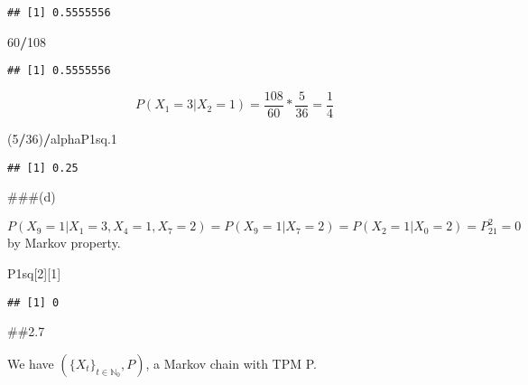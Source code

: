 \documentclass[]{article}
\newenvironment{Shaded}{\begin{snugshade}}{\end{snugshade}}
\newcommand{\DecValTok}[1]{\textcolor[rgb]{0.00,0.00,0.81}{#1}}
\newcommand{\FloatTok}[1]{\textcolor[rgb]{0.00,0.00,0.81}{#1}}
\newcommand{\NormalTok}[1]{#1}
\newcommand{\OperatorTok}[1]{\textcolor[rgb]{0.81,0.36,0.00}{\textbf{#1}}}
\newcommand{\StringTok}[1]{\textcolor[rgb]{0.31,0.60,0.02}{#1}}
\begin{document}
\begin{Shaded}
\end{Shaded}

\begin{verbatim}
## [1] 0.5555556
\end{verbatim}

\begin{Shaded}
\begin{Highlighting}[]
\DecValTok{60}\OperatorTok{/}\DecValTok{108}
\end{Highlighting}
\end{Shaded}

\begin{verbatim}
## [1] 0.5555556
\end{verbatim}

\[
P(X_1=3|X_2 = 1) = \frac{108}{60} * \frac{5}{36} =  \frac{1}{4}
\]

\begin{Shaded}
\begin{Highlighting}[]
\NormalTok{(}\DecValTok{5}\OperatorTok{/}\DecValTok{36}\NormalTok{)}\OperatorTok{/}\NormalTok{alphaP1sq}\FloatTok{.1}
\end{Highlighting}
\end{Shaded}

\begin{verbatim}
## [1] 0.25
\end{verbatim}

\#\#\#(d)

\[
P(X_9=1 | X_1 = 3, X_4=1, X_7=2) = P(X_9=1|X_7=2) = P(X_2=1|X_0=2) = P^2_{21} = 0
\] by Markov property.

\begin{Shaded}
\begin{Highlighting}[]
\NormalTok{P1sq[}\DecValTok{2}\NormalTok{][}\DecValTok{1}\NormalTok{]}
\end{Highlighting}
\end{Shaded}

\begin{verbatim}
## [1] 0
\end{verbatim}

\#\#2.7

We have \((\{X_t\}_{t \in \mathbb{N}_0} , P)\), a Markov chain with TPM
P.
\end{document}

